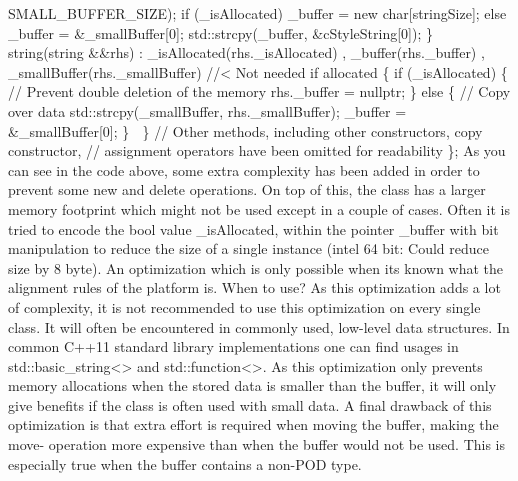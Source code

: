 SMALL\_BUFFER\_SIZE); if (\_isAllocated) \_buffer = new
char{[}stringSize{]}; else \_buffer = \&\_smallBuffer{[}0{]};
std::strcpy(\_buffer, \&cStyleString{[}0{]}); \} string(string \&\&rhs)
: \_isAllocated(rhs.\_isAllocated) , \_buffer(rhs.\_buffer) ,
\_smallBuffer(rhs.\_smallBuffer) //\textless{} Not needed if allocated
\{ if (\_isAllocated) \{ // Prevent double deletion of the memory
rhs.\_buffer = nullptr; \} else \{ // Copy over data
std::strcpy(\_smallBuffer, rhs.\_smallBuffer); \_buffer =
\&\_smallBuffer{[}0{]}; \}  \} // Other methods, including other
constructors, copy constructor, // assignment operators have been
omitted for readability \}; As you can see in the code above, some extra
complexity has been added in order to prevent some new and delete
operations. On top of this, the class has a larger memory footprint
which might not be used except in a couple of cases. Often it is tried
to encode the bool value \_isAllocated, within the pointer \_buffer with
bit manipulation to reduce the size of a single instance (intel 64 bit:
Could reduce size by 8 byte). An optimization which is only possible
when its known what the alignment rules of the platform is. When to use?
As this optimization adds a lot of complexity, it is not recommended to
use this optimization on every single class. It will often be
encountered in commonly used, low-level data structures. In common C++11
standard library implementations one can ﬁnd usages in
std::basic\_string\textless\textgreater{} and
std::function\textless\textgreater. As this optimization only prevents
memory allocations when the stored data is smaller than the buﬀer, it
will only give beneﬁts if the class is often used with small data. A
ﬁnal drawback of this optimization is that extra eﬀort is required when
moving the buﬀer, making the move- operation more expensive than when
the buﬀer would not be used. This is especially true when the buﬀer
contains a non-POD type.
